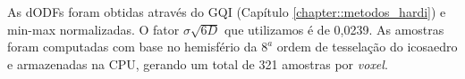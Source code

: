As dODFs foram obtidas através do GQI \cite{yeh2010} (Capítulo \ref{chapter::metodos_hardi}) e min-max normalizadas. O fator $\sigma \sqrt{6D}$ que utilizamos é de 0,0239. As amostras foram computadas com base no hemisfério da $8^{a}$ ordem de tesselação do icosaedro e armazenadas na CPU, gerando um total de 321 amostras por \textit{voxel}.








